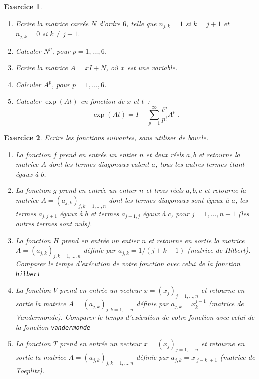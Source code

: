 \documentclass{article}
\newtheorem{exo}{Exercice}[section]
\begin{document}
\begin{exo}{\rm ~
\begin{enumerate}
\item
Ecrire la matrice carr\'ee $N$ d'ordre $6$, telle que $n_{j,k}=1$ si $k=j+1$ et
$n_{j,k}=0$ si $k \neq j+1$. 
\item
Calculer $N^p$, pour $p=1,\ldots,6$. 
\item
Ecrire la matrice $A=xI+N$, o\`u $x$ est une variable.
\item
Calculer $A^p$, pour $p=1,\ldots,6$. 
\item 
Calculer $\exp(At)$ en fonction de $x$ et $t$~:
$$
\exp(At) = I+\sum_{p=1}^\infty \frac{t^p}{p!} A^p\;.
$$
\end{enumerate} 
}\end{exo}
\begin{exo}{\rm 
Ecrire les fonctions suivantes, sans utiliser de boucle.
\begin{enumerate}
\item
La fonction $f$ prend en entr\'ee un entier $n$ 
et deux r\'eels $a, b$ et retourne
la matrice $A$ dont les termes diagonaux valent $a$, tous les autres
termes \'etant \'egaux \`a $b$.   
\item
La fonction $g$ prend en entr\'ee un entier $n$ et trois r\'eels $a,
b, c$ et retourne
la matrice $A=(a_{j,k})_{j,k=1,\ldots,n}$ dont les termes diagonaux
sont \'egaux \`a $a$, les termes $a_{j,j+1}$ \'egaux  \`a $b$ et  
termes $a_{j+1,j}$ \'egaux \`a $c$, pour $j=1,\ldots,n-1$ (les autres
termes sont nuls).  
\item
La fonction $H$ prend en entr\'ee un entier $n$ et retourne en sortie 
la matrice  $A=(a_{j,k})_{j,k=1,\ldots,n}$
d\'efinie par $a_{j,k} = 1/(j+k+1)$ (matrice de Hilbert).
Comparer le temps d'ex\'ecution de votre fonction avec celui de
la fonction \verb|hilbert|
\item
La fonction $V$ prend en entr\'ee un vecteur $x=(x_j)_{j=1,\ldots,n}$
et retourne en sortie la matrice $A=(a_{j,k})_{j,k=1,\ldots,n}$
d\'efinie par $a_{j,k} = x_k^{j-1}$ (matrice de Vandermonde).
Comparer le temps d'ex\'ecution de votre fonction avec celui de
la fonction \verb|vandermonde|
\item
La fonction $T$ prend en entr\'ee un vecteur $x=(x_j)_{j=1,\ldots,n}$
et retourne en sortie la matrice $A=(a_{j,k})_{j,k=1,\ldots,n}$
d\'efinie par $a_{j,k} = x_{|j-k|+1}$ (matrice de Toeplitz).
\end{enumerate}
}\end{exo}
\end{document}
